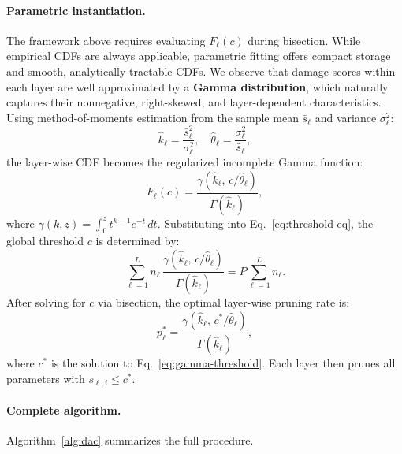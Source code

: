 ﻿\documentclass[11pt]{article}
\begin{document}
\paragraph{Parametric instantiation.}
The framework above requires evaluating $F_\ell(c)$ during bisection. While empirical CDFs are always applicable, parametric fitting offers compact storage and smooth, analytically tractable CDFs. We observe that damage scores within each layer are well approximated by a \textbf{Gamma distribution}, which naturally captures their nonnegative, right-skewed, and layer-dependent characteristics. Using method-of-moments estimation from the sample mean $\bar{s}_\ell$ and variance $\sigma_\ell^2$:
\begin{equation}
\hat{k}_\ell = \frac{\bar{s}_\ell^2}{\sigma_\ell^2}, \quad \hat{\theta}_\ell = \frac{\sigma_\ell^2}{\bar{s}_\ell},
\end{equation}
the layer-wise CDF becomes the regularized incomplete Gamma function:
\begin{equation}
F_\ell(c) = \frac{\gamma(\hat{k}_\ell,\, c/\hat{\theta}_\ell)}{\Gamma(\hat{k}_\ell)},
\end{equation}
where $\gamma(k, z) = \int_0^z t^{k-1} e^{-t}\,dt$. Substituting into Eq.~\eqref{eq:threshold-eq}, the global threshold $c$ is determined by:
\begin{equation}
\sum_{\ell=1}^L n_\ell \, \frac{\gamma(\hat{k}_\ell,\, c/\hat{\theta}_\ell)}{\Gamma(\hat{k}_\ell)} = P \sum_{\ell=1}^L n_\ell.
\label{eq:gamma-threshold}
\end{equation}
After solving for $c$ via bisection, the optimal layer-wise pruning rate is:
\begin{equation}
p_\ell^* = \frac{\gamma(\hat{k}_\ell,\, c^*/\hat{\theta}_\ell)}{\Gamma(\hat{k}_\ell)},
\label{eq:layer-rate}
\end{equation}
where $c^*$ is the solution to Eq.~\eqref{eq:gamma-threshold}. Each layer then prunes all parameters with $s_{\ell,i} \le c^*$.

\paragraph{Complete algorithm.}
Algorithm~\ref{alg:dac} summarizes the full procedure.
\end{document}
